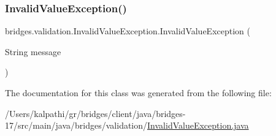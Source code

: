 \subsubsection{\texorpdfstring{Invalid\+Value\+Exception()}{InvalidValueException()}}
{\footnotesize\ttfamily bridges.\+validation.\+Invalid\+Value\+Exception.\+Invalid\+Value\+Exception (\begin{DoxyParamCaption}\item[{String}]{message }\end{DoxyParamCaption})}



The documentation for this class was generated from the following file\+:\begin{DoxyCompactItemize}
\item 
/\+Users/kalpathi/gr/bridges/client/java/bridges-\/17/src/main/java/bridges/validation/\mbox{\hyperlink{_invalid_value_exception_8java}{Invalid\+Value\+Exception.\+java}}\end{DoxyCompactItemize}
